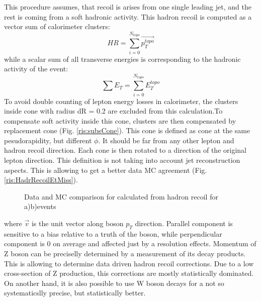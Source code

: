 This procedure assumes, that recoil is arises from one single leading jet, and the rest  is coming from a soft hadronic activity. This hadron recoil is computed as a vector sum of calorimeter clusters:
\begin{equation}
HR= \sum_{i=0}^{N_{topo}}\vec{p_T^{topo}}
\end{equation}
while a scalar sum of all transverse energies is corresponding to the hadronic activity of the event:
\begin{equation}\label{eq:sumet}
\sum E_T =\sum_{i=0}^{N_{topo}} E_T^{topo}
\end{equation}
To avoid double counting of lepton energy losses in calorimeter, the clusters inside cone with radius dR = 0.2 are excluded from this calculation.To compensate soft activity inside this cone, clusters are then compensated by replacement cone (Fig. \ref{ris:subsCone}). This cone is defined as cone at the same pesudorapidity, but different $\phi$. It should be far from any other lepton and hadron recoil direction. Each cone is then rotated to a direction of the original lepton direction. This definition is not taking into account jet reconstruction aspects.   This is allowing to get a better data MC agreement (Fig. \ref{ris:HadrRecoilEtMiss}).
\begin{figure}[b]
\begin{minipage}[h]{0.49\linewidth}
\end{minipage}
\hfill
\begin{minipage}[h]{0.49\linewidth}
\end{minipage}
\caption{Data and MC comparison for \etmiss calculated from hadron recoil for a)\wenu b)\wmunu events}
\label{ris:EtMissRefFinal}
\end{figure}



where $\vec{v}$ is the unit vector along boson $p_{T}$ direction. Parallel component is sensitive to a bias relative to a truth \ptw of the boson, while perpendicular component is 0 on average and affected just by a resolution effects.  
Momentum of Z boson can be preciselly determined by a measurement of its decay products. This is allowing to determine data driven hadron recoil corrections. Due to a low cross-section of Z production, this corrections are mostly statistically dominated.
On another hand, it is also possible to use W boson decays for a not so systematicslly precise, but statistically better. 


